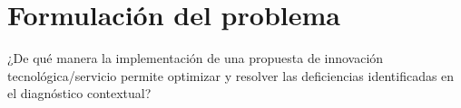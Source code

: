 \section{Formulación del problema}
\label{sec:formulacion_problema}
¿De qué manera la implementación de una propuesta de innovación tecnológica/servicio permite optimizar y resolver las deficiencias identificadas en el diagnóstico contextual?
